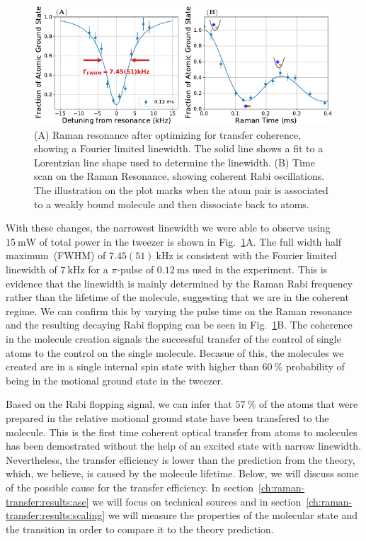 \begin{figure}
  \centering
  \includegraphics[width=\textwidth]{figures/raman_transfer_fit_one_ase_init.pdf}
  \caption[Raman resonance with Fourier limited linewidth and Rabi flopping.]{
    (A) Raman resonance after optimizing for transfer coherence,
    showing a Fourier limited linewidth.
    The solid line shows a fit to a Lorentzian line shape used to determine the linewidth.
    (B) Time scan on the Raman Resonance, showing coherent Rabi oscillations.
    The illustration on the plot marks when the atom pair is associated to a weakly bound
    molecule and then dissociate back to atoms.
    \label{fig:raman-transfer:results:init}}
\end{figure}

With these changes, the narrowest linewidth we were able to observe using $15~\mathrm{mW}$
of total power in the tweezer is shown in Fig.~\ref{fig:raman-transfer:results:init}A.
The full width half maximum~(FWHM) of $7.45(51)~\mathrm{kHz}$ is consistent
with the Fourier limited linewidth of $7~\mathrm{kHz}$
for a $\pi$-pulse of $0.12~\mathrm{ms}$ used in the experiment.
This is evidence that the linewidth is mainly determined by the Raman Rabi frequency
rather than the lifetime of the molecule, suggesting that we are in the coherent regime.
We can confirm this by varying the pulse time on the Raman resonance
and the resulting decaying Rabi flopping can be seen in
Fig.~\ref{fig:raman-transfer:results:init}B.
The coherence in the molecule creation signals the successful transfer
of the control of single atoms to the control on the single molecule.
Becasue of this, the molecules we created are in a single internal spin state
with higher than $60~\mathrm{\%}$ probability
of being in the motional ground state in the tweezer.

Based on the Rabi flopping signal, we can infer that $57~\mathrm{\%}$ of the atoms
that were prepared in the relative motional ground state have been transfered to the molecule.
This is the first time coherent optical transfer from atoms to molecules has been demostrated
without the help of an excited state with narrow linewidth.
Nevertheless, the transfer efficiency is lower than the prediction from the theory,
which, we believe, is caused by the molecule lifetime.
Below, we will discuss some of the possible cause for the transfer efficiency.
In section~\ref{ch:raman-transfer:results:ase} we will focus on technical sources
and in section~\ref{ch:raman-transfer:results:scaling}
we will measure the properties of the molecular state and the transition
in order to compare it to the theory prediction.

